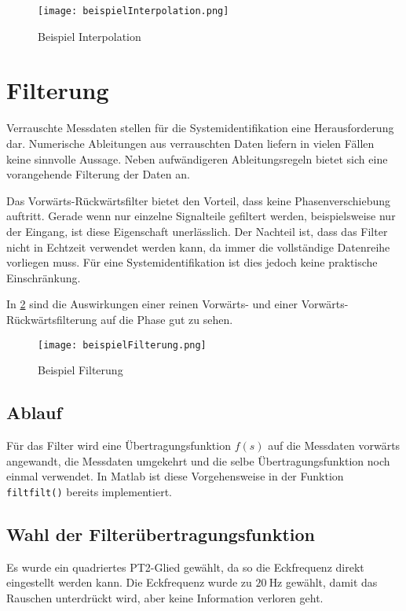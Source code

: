 \begin{figure}[h!]
	\centering
	\texttt{[image: beispielInterpolation.png]}
	\caption{Beispiel Interpolation}
	\label{fig:interpBsp}
\end{figure}





\section{Filterung} \label{section:filterung}%
Verrauschte Messdaten stellen für die Systemidentifikation eine Herausforderung dar. Numerische Ableitungen aus verrauschten 
Daten liefern in vielen Fällen keine sinnvolle Aussage. Neben aufwändigeren Ableitungsregeln bietet sich eine vorangehende 
Filterung der Daten an.\par
Das Vorwärts-Rückwärtsfilter bietet den Vorteil, dass keine Phasenverschiebung auftritt. Gerade wenn nur einzelne Signalteile 
gefiltert werden, beispielsweise nur der Eingang, ist diese Eigenschaft unerlässlich. Der Nachteil ist, dass das Filter nicht 
in Echtzeit verwendet werden kann, da immer die vollständige Datenreihe vorliegen muss. Für eine Systemidentifikation ist dies jedoch keine praktische Einschränkung. \cite{Gschwandtner2019}

In \cref{fig:filterBsp} sind die Auswirkungen einer reinen Vorwärts- und einer Vorwärts-Rückwärtsfilterung auf die Phase 
gut zu sehen.

\begin{figure}[h!]
	\centering
	\texttt{[image: beispielFilterung.png]}
	\caption{Beispiel Filterung}
	\label{fig:filterBsp}
\end{figure}


\subsection{Ablauf}
Für das Filter wird eine Übertragungsfunktion $f(s)$ auf die Messdaten vorwärts 
angewandt, die Messdaten umgekehrt und die selbe Übertragungsfunktion noch 
einmal verwendet. In Matlab ist diese Vorgehensweise in der Funktion \texttt{filtfilt()} 
bereits implementiert. 


\subsection{Wahl der Filterübertragungsfunktion}
Es wurde ein quadriertes PT2-Glied gewählt, da so die Eckfrequenz direkt eingestellt werden kann. Die Eckfrequenz wurde zu $ 
\SI{20}{\hertz} $ gewählt, damit das Rauschen unterdrückt wird, aber keine Information verloren geht.

